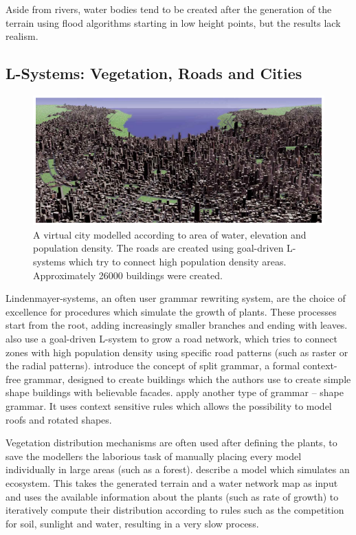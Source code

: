 \documentclass{acmtog}
\begin{document}
Aside from rivers, water bodies tend to be created after the generation of the terrain using flood algorithms starting in low height points, but the results lack realism.

\subsection{L-Systems: Vegetation, Roads and Cities}

\begin{figure}[!htp]
	\begin{center}
		\includegraphics[width=\columnwidth]{images/city.png}
	\end{center}
	\caption{A virtual city modelled according to area of water, elevation and population density. The roads are created using goal-driven L-systems which try to connect high population density areas. Approximately 26000 buildings were created.}
\end{figure}

Lindenmayer-systems, an often user grammar rewriting system, are the choice of excellence for procedures which simulate the growth of plants. These processes start from the root, adding increasingly smaller branches and ending with leaves. \cite{Parish01} also use a goal-driven L-system to grow a road network, which tries to connect zones with high population density using specific road patterns (such as raster or the radial patterns). \cite{Wonka03} introduce the concept of split grammar, a formal context-free grammar, designed to create buildings which the authors use to create simple shape buildings with believable facades. \cite{Muller06} apply another type of grammar -- shape grammar. It uses context sensitive rules which allows the possibility to model roofs and rotated shapes.

Vegetation distribution mechanisms are often used after defining the plants, to save the modellers the laborious task of manually placing every model individually in large areas (such as a forest). \cite{Deussen98} describe a model which simulates an ecosystem. This takes the generated terrain and a water network map as input and uses the available information about the plants (such as rate of growth) to iteratively compute their distribution according to rules such as the competition for soil, sunlight and water, resulting in a very slow process.
\end{document}
